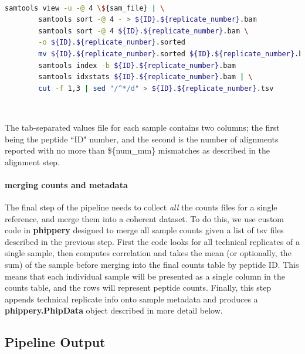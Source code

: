 \documentclass{article}
\begin{document}
~

\begin{lstlisting}[language=bash,caption={bash version}, caption={samtools processing steps},captionpos=b,numbers=none,label=listing:samtools.bash]
        samtools view -u -@ 4 \${sam_file} | \
        samtools sort -@ 4 - > ${ID}.${replicate_number}.bam
        samtools sort -@ 4 ${ID}.${replicate_number}.bam \
        -o ${ID}.${replicate_number}.sorted 
        mv ${ID}.${replicate_number}.sorted ${ID}.${replicate_number}.bam
        samtools index -b ${ID}.${replicate_number}.bam
        samtools idxstats ${ID}.${replicate_number}.bam | \
        cut -f 1,3 | sed "/^*/d" > ${ID}.${replicate_number}.tsv
\end{lstlisting}

~

The tab-separated values file for each sample contains two columns; the first being the peptide ``ID" number, and the second is the number of alignments reported with no more than \$\{num\_mm\} mismatches as described in the alignment step.

\paragraph{merging counts and metadata}
The final step of the pipeline needs to collect \textit{all} the counts files for a single reference, and merge them into a coherent dataset.
To do this, we use custom code in \textbf{phippery} designed to merge all sample counts given a list of tsv files described in the previous step. 
First the code looks for all technical replicates of a single sample, then computes correlation and takes the mean (or optionally, the sum) of the sample before merging into the final counts table by peptide ID. 
This means that each individual sample will be presented as a single column in the counts table, and the rows will represent peptide counts. 
Finally, this step appends technical replicate info onto sample metadata and produces a \textbf{phippery.PhipData} object described in more detail below.

\subsection*{Pipeline Output}
\end{document}
